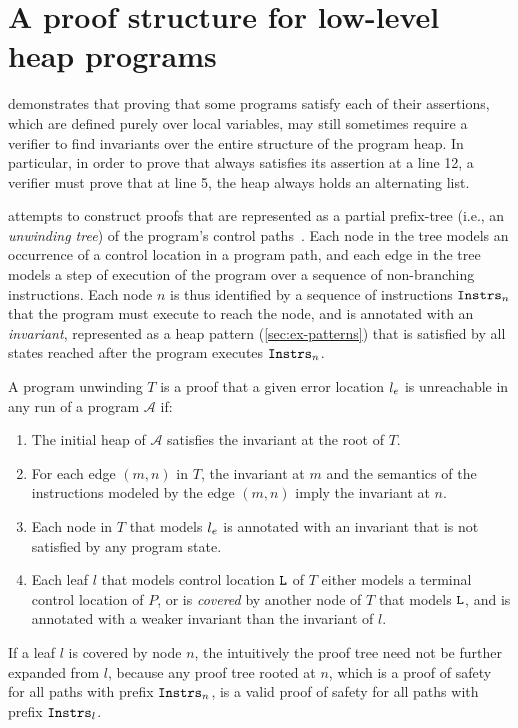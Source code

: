 \section{A proof structure for low-level heap programs}
\label{sec:ex-tree}
\altlist demonstrates that proving that some programs satisfy each of
their assertions, which are defined purely over local variables, may
still sometimes require a verifier to find invariants over the entire
structure of the program heap.
%
In particular, in order to prove that \altlist always satisfies its
assertion at a line 12, a verifier must prove that at line 5, the heap
always holds an alternating list.

\verifier attempts to construct proofs that are represented as a
partial prefix-tree (i.e., an \emph{unwinding tree}) of the program's
control paths~\cite{mcmillan06}.
Each node in the tree models an occurrence of a control location in a
program path, and each edge in the tree models a step of execution of
the program over a sequence of non-branching instructions.
Each node $n$ is thus identified by a sequence of instructions
$\mathtt{Instrs}_n$ that the program must execute to reach the node, and is
annotated with an \emph{invariant}, represented as a heap pattern
(\autoref{sec:ex-patterns}) that is satisfied by all states reached
after the program executes $\mathtt{Instrs}_n$.

A program unwinding $T$ is a proof that a given error location $l_e$
is unreachable in any run of a program $\mathcal{A}$ if:
%
\begin{enumerate}
%
\item
  The initial heap of $\mathcal{A}$ satisfies the invariant at the root of $T$.
\item
  For each edge $(m, n)$ in $T$, the invariant at $m$ and the
  semantics of the instructions modeled by the edge $(m, n)$ imply the
  invariant at $n$.
\item
  Each node in $T$ that models $l_e$ is annotated with an
  invariant that is not satisfied by any program state.
\item
  Each leaf $l$ that models control location $\mathtt{L}$ of $T$ either
  models a terminal control location of $P$, or is \emph{covered} by
  another node of $T$ that models $\mathtt{L}$, and is annotated with a
  weaker invariant than the invariant of $l$.
\end{enumerate}
%
If a leaf $l$ is covered by node $n$, the intuitively the proof tree
need not be further expanded from $l$, because any proof tree rooted
at $n$, which is a proof of safety for all paths with prefix
$\mathtt{Instrs}_n$, is a valid proof of safety for all paths with prefix
$\mathtt{Instrs}_l$.

